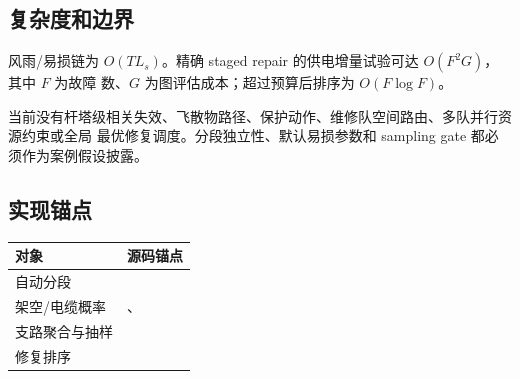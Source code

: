\subsection{复杂度和边界}
风雨/易损链为 $O(TL_s)$。精确 staged repair 的供电增量试验可达 $O(F^2G)$，其中 $F$ 为故障
数、$G$ 为图评估成本；超过预算后排序为 $O(F\log F)$。

\begin{gapnote}
当前没有杆塔级相关失效、飞散物路径、保护动作、维修队空间路由、多队并行资源约束或全局
最优修复调度。分段独立性、默认易损参数和 sampling gate 都必须作为案例假设披露。
\end{gapnote}

\subsection{实现锚点}
\begin{center}\small
\begin{tabular}{@{}L{5.1cm}L{8.6cm}@{}}
\toprule
对象 & 源码锚点\\
\midrule
自动分段 & \\
架空/电缆概率 & 、
\\
支路聚合与抽样 & \\
修复排序 & \\
\bottomrule
\end{tabular}
\end{center}
